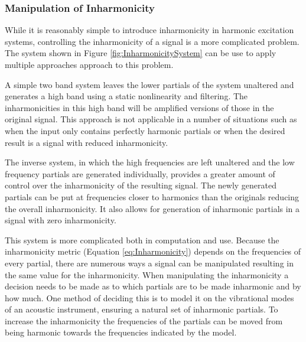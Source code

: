 		\subsubsection*{Manipulation of Inharmonicity}
			While it is reasonably simple to introduce inharmonicity in harmonic excitation systems,
			controlling the inharmonicity of a signal is a more complicated problem. The system shown in Figure
			\ref{fig:InharmonicitySystem} can be use to apply multiple approaches approach to this problem. 

			
			A simple two band system leaves the lower partials of the system unaltered and generates a high
			band using a static nonlinearity and filtering. The inharmonicities in this high band will be
			amplified versions of those in the original signal. This approach is not applicable in a number of
			situations such as when the input only contains perfectly harmonic partials or when the desired
			result is a signal with reduced inharmonicity.
			
			The inverse system, in which the high frequencies are left unaltered and the low frequency partials
			are generated individually, provides a greater amount of control over the inharmonicity of the
			resulting signal. The newly generated partials can be put at frequencies closer to harmonics than
			the originals reducing the overall inharmonicity. It also allows for generation of inharmonic
			partials in a signal with zero inharmonicity. 

			This system is more complicated both in computation and use. Because the inharmonicity metric
			(Equation \ref{eq:Inharmonicity}) depends on the frequencies of every partial, there are numerous
			ways a signal can be manipulated resulting in the same value for the inharmonicity. When
			manipulating the inharmonicity a decision needs to be made as to which partials are to be made
			inharmonic and by how much. One method of deciding this is to model it on the vibrational modes of
			an acoustic instrument, ensuring a natural set of inharmonic partials. To increase the
			inharmonicity the frequencies of the partials can be moved from being harmonic towards the
			frequencies indicated by the model.

